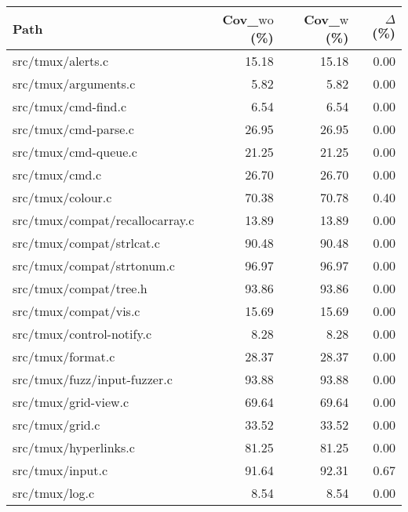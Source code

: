 \documentclass[11pt,a4paper,twocolumn]{article}
\begin{document}
\begin{table*}[!tb]  %
	\centering
	\scriptsize
	\setlength{\tabcolsep}{4pt}    %
	\renewcommand{\arraystretch}{1.1}

	\begin{tabular}{@{}lrrr@{}}     %
		\toprule
		Path                                &
		Cov\_$\text{wo}$ (\%)               &
		Cov\_$\text{w}$ (\%)                &
		$\Delta$ (\%)                                              \\
		\midrule
		src/tmux/alerts.c                   & 15.18 & 15.18 & 0.00 \\
		src/tmux/arguments.c                & 5.82  & 5.82  & 0.00 \\
		src/tmux/cmd-find.c                 & 6.54  & 6.54  & 0.00 \\
		src/tmux/cmd-parse.c                & 26.95 & 26.95 & 0.00 \\
		src/tmux/cmd-queue.c                & 21.25 & 21.25 & 0.00 \\
		src/tmux/cmd.c                      & 26.70 & 26.70 & 0.00 \\
		\rowcolor{yellow} src/tmux/colour.c & 70.38 & 70.78 & 0.40 \\
		src/tmux/compat/recallocarray.c     & 13.89 & 13.89 & 0.00 \\
		src/tmux/compat/strlcat.c           & 90.48 & 90.48 & 0.00 \\
		src/tmux/compat/strtonum.c          & 96.97 & 96.97 & 0.00 \\
		src/tmux/compat/tree.h              & 93.86 & 93.86 & 0.00 \\
		src/tmux/compat/vis.c               & 15.69 & 15.69 & 0.00 \\
		src/tmux/control-notify.c           & 8.28  & 8.28  & 0.00 \\
		src/tmux/format.c                   & 28.37 & 28.37 & 0.00 \\
		src/tmux/fuzz/input-fuzzer.c        & 93.88 & 93.88 & 0.00 \\
		src/tmux/grid-view.c                & 69.64 & 69.64 & 0.00 \\
		src/tmux/grid.c                     & 33.52 & 33.52 & 0.00 \\
		src/tmux/hyperlinks.c               & 81.25 & 81.25 & 0.00 \\
		\rowcolor{yellow} src/tmux/input.c  & 91.64 & 92.31 & 0.67 \\
		src/tmux/log.c                      & 8.54  & 8.54  & 0.00 \\

\end{tabular}
\end{table*}
\end{document}
